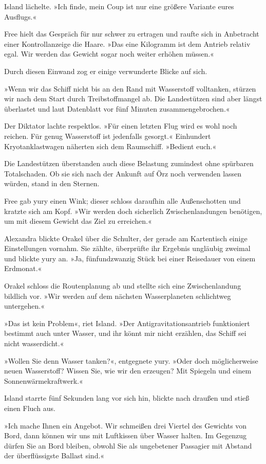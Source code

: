 Island lächelte. »Ich finde, mein Coup ist nur eine größere Variante eures Ausflugs.«

Free hielt das Gespräch für nur schwer zu ertragen und raufte sich in Anbetracht einer Kontrollanzeige die Haare. »Das eine Kilogramm ist dem Antrieb relativ egal. Wir werden das Gewicht sogar noch weiter erhöhen müssen.«

Durch diesen Einwand zog er einige verwunderte Blicke auf sich.

»Wenn wir das Schiff nicht bis an den Rand mit Wasserstoff volltanken, stürzen wir nach dem Start durch Treibstoffmangel ab. Die Landestützen sind aber längst überlastet und laut Datenblatt vor fünf Minuten zusammengebrochen.«

Der Diktator lachte respektlos. »Für einen letzten Flug wird es wohl noch reichen. Für genug Wasserstoff ist jedenfalls gesorgt.« Einhundert Kryotanklastwagen näherten sich dem Raumschiff. »Bedient euch.«

Die Landestützen überstanden auch diese Belastung zumindest ohne spürbaren Totalschaden. Ob sie sich nach der Ankunft auf Örz noch verwenden lassen würden, stand in den Sternen.

Free gab yury einen Wink; dieser schloss daraufhin alle Außenschotten und kratzte sich am Kopf. »Wir werden doch sicherlich Zwischenlandungen benötigen, um mit diesem Gewicht das Ziel zu erreichen.«

Alexandra blickte Orakel über die Schulter, der gerade am Kartentisch einige Einstellungen vornahm. Sie zählte, überprüfte ihr Ergebnis ungläubig zweimal und blickte yury an. »Ja, fünfundzwanzig Stück bei einer Reisedauer von einem Erdmonat.«

Orakel schloss die Routenplanung ab und stellte sich eine Zwischenlandung bildlich vor. »Wir werden auf dem nächsten Wasserplaneten schlichtweg untergehen.«

»Das ist kein Problem«, riet Island. »Der Antigravitationsantrieb funktioniert bestimmt auch unter Wasser, und ihr könnt mir nicht erzählen, das Schiff sei nicht wasserdicht.«

»Wollen Sie denn Wasser tanken?«, entgegnete yury. »Oder doch möglicherweise neuen Wasserstoff? Wissen Sie, wie wir den erzeugen? Mit Spiegeln und einem Sonnenwärmekraftwerk.«

Island starrte fünf Sekunden lang vor sich hin, blickte nach draußen und stieß einen Fluch aus.

»Ich mache Ihnen ein Angebot. Wir schmeißen drei Viertel des Gewichts von Bord, dann können wir uns mit Luftkissen über Wasser halten. Im Gegenzug dürfen Sie an Bord bleiben, obwohl Sie als ungebetener Passagier mit Abstand der überflüssigste Ballast sind.«

